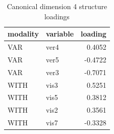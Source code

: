 \begin{table}
\caption{Canonical dimension 4 structure loadings}
\label{tab:cca_dimension_4_loadings}
\begin{tabular}{llr}
\toprule
modality & variable & loading \\
\midrule
VAR & ver4 & 0.4052 \\
VAR & ver5 & -0.4722 \\
VAR & ver3 & -0.7071 \\
WITH & vis3 & 0.5251 \\
WITH & vis5 & 0.3812 \\
WITH & vis2 & 0.3561 \\
WITH & vis7 & -0.3328 \\
\bottomrule
\end{tabular}
\end{table}
